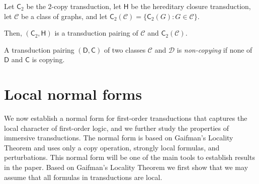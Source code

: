 \documentclass{lmcs}
\newcommand{\Cc}{\mathscr{C}}
\newcommand{\Dd}{\mathscr{D}}
\theoremstyle{definition}
\begin{document}
\begin{exa}
	Let $\mathsf C_2$ be the $2$-copy transduction, let $\mathsf H$ be the hereditary closure transduction,
	let $\Cc$ be a class of graphs, and 
	let $\mathsf C_2(\Cc)=\{\mathsf C_2(G)\colon G\in\Cc\}$.
	
	Then, 
	$(\mathsf C_2,\mathsf H)$ is a transduction pairing of $\Cc$ and
	$\mathsf C_2(\Cc)$.
\end{exa}

A transduction pairing $(\mathsf D,\mathsf C)$ of two classes $\Cc$ and $\Dd$ is \emph{non-copying} if none of $\mathsf D$ and $\mathsf C$ is copying. 

\section{Local normal forms}
\label{sec:norm}
We now establish a normal form for first-order transductions that
captures the local character of first-order logic, and we further
study the properties of immersive transductions. The normal form is
based on Gaifman's Locality Theorem and uses only a copy operation, strongly local
formulas, and perturbations. 
This normal form will be one of the main tools to 
establish results in the paper. Based on Gaifman's Locality Theorem we first show that we may assume that all formulas in transductions are local. 
\end{document}

